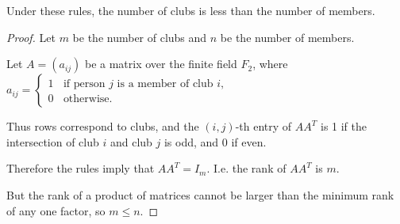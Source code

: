 \begin{theorem}
  Under these rules, the number of clubs is less than the number of members.
\end{theorem}

\begin{proof}
  Let $m$ be the number of clubs and $n$ be the number of members.

  Let $A = (a_{ij})$ be a matrix over the finite field $F_2$, where $a_{ij} =
  \begin{cases}
    1 ~~~~ \text{if person $j$ is a member of club $i$},\\
    0 ~~~~ \text{otherwise}.
  \end{cases}
$

Thus rows correspond to clubs, and the $(i,j)$-th entry of $AA^T$ is 1 if the intersection of club
$i$ and club $j$ is odd, and 0 if even.

Therefore the rules imply that $AA^T = I_m$. I.e. the rank of $AA^T$ is $m$.

But the rank of a product of matrices cannot be larger than the minimum rank of any one factor, so
$m \leq n$.
\end{proof}
